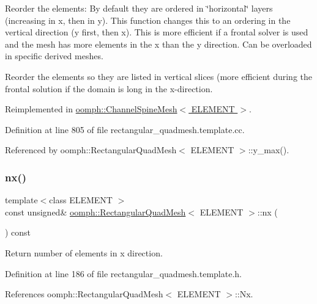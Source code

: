 Reorder the elements\+: By default they are ordered in \char`\"{}horizontal\char`\"{} layers (increasing in x, then in y). This function changes this to an ordering in the vertical direction (y first, then x). This is more efficient if a frontal solver is used and the mesh has more elements in the x than the y direction. Can be overloaded in specific derived meshes. 

Reorder the elements so they are listed in vertical slices (more efficient during the frontal solution if the domain is long in the x-\/direction. 

Reimplemented in \hyperlink{classoomph_1_1ChannelSpineMesh_ad449460c4d06b2be64b53097143a3b09}{oomph\+::\+Channel\+Spine\+Mesh$<$ E\+L\+E\+M\+E\+N\+T $>$}.



Definition at line 805 of file rectangular\+\_\+quadmesh.\+template.\+cc.



Referenced by oomph\+::\+Rectangular\+Quad\+Mesh$<$ E\+L\+E\+M\+E\+N\+T $>$\+::y\+\_\+max().

\mbox{\label{classoomph_1_1RectangularQuadMesh_abfef93d6322886cdce14a437186e4821}} 
\subsubsection{\texorpdfstring{nx()}{nx()}}
{\footnotesize\ttfamily template$<$class E\+L\+E\+M\+E\+NT $>$ \\
const unsigned\& \hyperlink{classoomph_1_1RectangularQuadMesh}{oomph\+::\+Rectangular\+Quad\+Mesh}$<$ E\+L\+E\+M\+E\+NT $>$\+::nx (\begin{DoxyParamCaption}{ }\end{DoxyParamCaption}) const\hspace{0.3cm}{\ttfamily [inline]}}



Return number of elements in x direction. 



Definition at line 186 of file rectangular\+\_\+quadmesh.\+template.\+h.



References oomph\+::\+Rectangular\+Quad\+Mesh$<$ E\+L\+E\+M\+E\+N\+T $>$\+::\+Nx.



